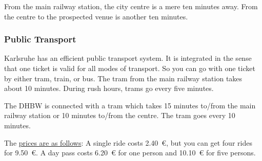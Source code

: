 From the main railway station, the city centre is a mere ten minutes 
away.
From the centre to the prospected venue is another ten minutes.



\subsubsection{Public Transport}

Karlsruhe has an efficient public transport system.
It is integrated in the sense that one ticket is valid
for all modes of transport.
So you can go with one ticket by either tram, train, or bus.
The tram from the main railway station takes about 10 minutes.
During rush hours, trams go every five minutes.

The DHBW is connected with a tram which takes 15 minutes to/from the 
main railway station or 10 minutes to/from the centre.
The tram goes every 10 minutes.

The 
\href{http://www.kvv.de/fahrkarten/fahrkarten-preise/einzelfahrkarten.html}%
{prices are as follows}:
A single ride costs \SI{2.40}{\euro}, but you can get four rides for \SI{9.50}{\euro}.
A day pass costs \SI{6.20}{\euro} for one person and \SI{10.10}{\euro} for five 
persons.

\newpage
